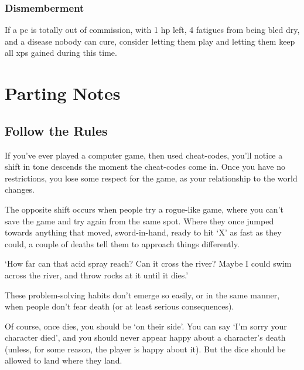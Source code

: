 \begin{multicols}{2}
\subsubsection{Dismemberment}

If a \gls{pc} is totally out of commission, with 1 \gls{hp} left, 4 \glspl{fatigue} from being bled dry, and a disease nobody can cure, consider letting them play  and letting them keep all \glspl{xp} gained during this time.

\end{multicols}

\section{Parting Notes}

\begin{multicols}{2}

\subsection{Follow the Rules}

If you've ever played a computer game, then used cheat-codes, you'll notice a shift in tone descends the moment the cheat-codes come in.
Once you have no restrictions, you lose some respect for the game, as your relationship to the world changes.

The opposite shift occurs when people try a rogue-like game, where you can't save the game and try again from the same spot.
Where they once jumped towards anything that moved, sword-in-hand, ready to hit `X' as fast as they could, a couple of deaths tell them to approach things differently.

\begin{speechtext}
  `How far can that acid spray reach?
  Can it cross the river?
  Maybe I could swim across the river, and throw rocks at it until it dies.'
\end{speechtext}

These problem-solving habits don't emerge so easily, or in the same manner, when people don't fear death (or at least serious consequences).

Of course, once  dies, you should be `on their side'.
You can say `I'm sorry your character died', and you should never appear happy about a character's death (unless, for some reason, the player is happy about it).
But the dice should be allowed to land where they land.


\end{multicols}
